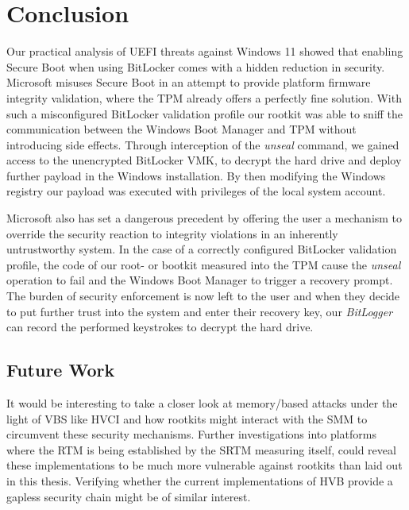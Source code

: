 
\chapter{Conclusion}
\label{sec:conclusion}

Our practical analysis of \ac{UEFI} threats against Windows 11 showed that enabling Secure Boot when using BitLocker comes with a hidden reduction in security.
Microsoft misuses Secure Boot in an attempt to provide platform firmware integrity validation, where the \ac{TPM} already offers a perfectly fine solution.
With such a misconfigured BitLocker validation profile our rootkit was able to sniff the communication between the Windows Boot Manager and \ac{TPM} without introducing side effects.
Through interception of the \emph{unseal} command, we gained access to the unencrypted BitLocker \ac{VMK}, to decrypt the hard drive and deploy further payload in the Windows installation.
By then modifying the Windows registry our payload was executed with privileges of the local system account.

Microsoft also has set a dangerous precedent by offering the user a mechanism to override the security reaction to integrity violations in an inherently untrustworthy system.
In the case of a correctly configured BitLocker validation profile, the code of our root- or bootkit measured into the \ac{TPM} cause the \emph{unseal} operation to fail and the Windows Boot Manager to trigger a recovery prompt.
The burden of security enforcement is now left to the user and when they decide to put further trust into the system and enter their recovery key, our \emph{BitLogger} can record the performed keystrokes to decrypt the hard drive.

\section*{Future Work}

It would be interesting to take a closer look at memory\-/based attacks under the light of \ac{VBS} like \ac{HVCI} and how rootkits might interact with the \ac{SMM} to circumvent these security mechanisms.
Further investigations into platforms where the \ac{RTM} is being established by the \ac{SRTM} measuring itself, could reveal these implementations to be much more vulnerable against rootkits than laid out in this thesis.
Verifying whether the current implementations of \ac{HVB} provide a gapless security chain might be of similar interest.